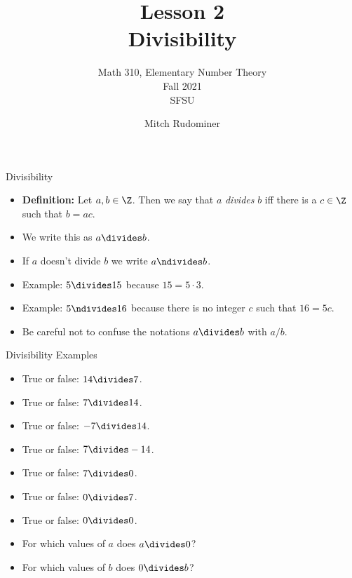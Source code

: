 \documentclass[handout]{beamer}
\title{Lesson 2 \\ Divisibility}
\subtitle{Math 310, Elementary Number Theory \\ Fall 2021 \\ SFSU}
\author{Mitch Rudominer}
\date{}
\begin{document}
\begin{frame}
  \titlepage
\end{frame}

\begin{frame}{Divisibility}


\begin{itemize}
  \item \textbf{Definition:} Let $a,b\in\Z$. Then we say that $a$ \emph{divides}
  $b$ iff there is a $c\in\Z$ such that $b = a c$.
  \item We write this as $a\divides b$.
  \item If $a$ doesn't divide $b$ we write $a\ndivides b$.
  \item Example: $5 \divides 15$ because $15 = 5 \cdot 3$.
  \item Example: $5 \ndivides 16$ because there is no integer $c$ such that
  $16 = 5  c$.
  \item Be careful not to confuse the notations $a\divides b$ with $a / b$.
\end{itemize}

\end{frame}



\begin{frame}{Divisibility Examples}

\begin{itemize}
  \item True or false: $14 \divides 7$.
  \item True or false: $7 \divides 14$.
  \item True or false: $-7 \divides 14$.
  \item True or false: $7 \divides -14$.
  \item True or false: $7 \divides 0$.
  \item True or false: $0 \divides 7$.
  \item True or false: $0 \divides 0$.
  \item For which values of $a$ does $a \divides 0$?
  \item For which values of $b$ does $0 \divides b$?
\end{itemize}

\end{frame}

\end{document}
